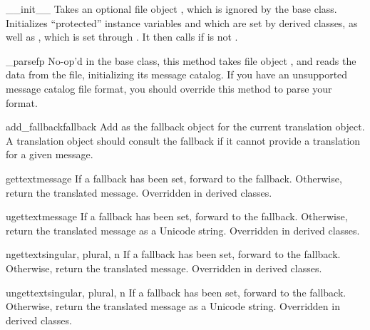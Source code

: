\begin{methoddesc}[NullTranslations]{__init__}{}
Takes an optional file object , which is ignored by the base
class.  Initializes ``protected'' instance variables  and
 which are set by derived classes, as well as ,
which is set through .  It then calls
 if  is not .
\end{methoddesc}

\begin{methoddesc}[NullTranslations]{_parse}{fp}
No-op'd in the base class, this method takes file object , and
reads the data from the file, initializing its message catalog.  If
you have an unsupported message catalog file format, you should
override this method to parse your format.
\end{methoddesc}

\begin{methoddesc}[NullTranslations]{add_fallback}{fallback}
Add  as the fallback object for the current translation
object. A translation object should consult the fallback if it cannot
provide a translation for a given message.
\end{methoddesc}

\begin{methoddesc}[NullTranslations]{gettext}{message}
If a fallback has been set, forward  to the fallback.
Otherwise, return the translated message.  Overridden in derived classes.
\end{methoddesc}

\begin{methoddesc}[NullTranslations]{ugettext}{message}
If a fallback has been set, forward  to the fallback.
Otherwise, return the translated message as a Unicode string.
Overridden in derived classes.
\end{methoddesc}

\begin{methoddesc}[NullTranslations]{ngettext}{singular, plural, n}
If a fallback has been set, forward  to the fallback.
Otherwise, return the translated message.  Overridden in derived classes.

\end{methoddesc}

\begin{methoddesc}[NullTranslations]{ungettext}{singular, plural, n}
If a fallback has been set, forward  to the fallback.
Otherwise, return the translated message as a Unicode string.
Overridden in derived classes.

\end{methoddesc}

